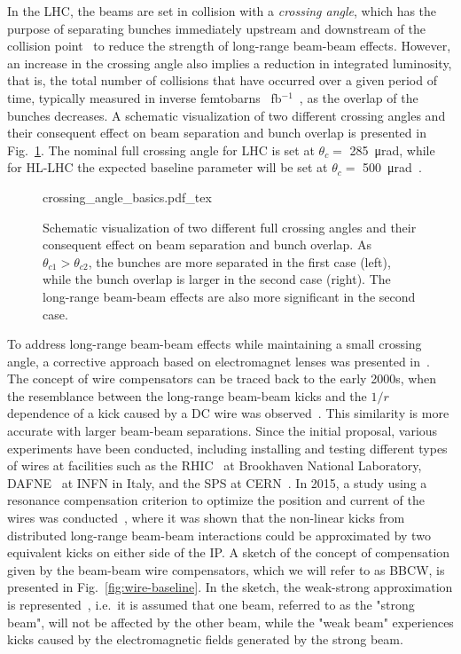 In the LHC, the beams are set in collision with a \textit{crossing angle}, which has the purpose of separating bunches immediately upstream and downstream of the collision point~\cite{Arduini_2016} to reduce the strength of long-range beam-beam effects. However, an increase in the crossing angle also implies a reduction in integrated luminosity, that is, the total number of collisions that have occurred over a given period of time, typically measured in inverse femtobarns \SI{}{fb}$^{-1}$~\cite{Herr:941318}, as the overlap of the bunches decreases. A schematic visualization of two different crossing angles and their consequent effect on beam separation and bunch overlap is presented in Fig.~\ref{fig:crossing-angles}. The nominal full crossing angle for LHC is set at $\theta_c =$ \SI{285}{\micro\radian}, while for HL-LHC the expected baseline parameter will be set at $\theta_c =$ \SI{500}{\micro\radian}~\cite{BejarAlonso:2749422}. 

\begin{figure}[hpt]
    \centering
    \def\svgwidth{1.0\textwidth}
    {crossing_angle_basics.pdf_tex}
    \caption{Schematic visualization of two different full crossing angles and their consequent effect on beam separation and bunch overlap. As $\theta_{c1} > \theta_{c2}$, the bunches are more separated in the first case (left), while the bunch overlap is larger in the second case (right). The long-range beam-beam effects are also more significant in the second case.}
    \label{fig:crossing-angles}
\end{figure}

To address long-range beam-beam effects while maintaining a small crossing angle, a corrective approach based on electromagnet lenses was presented in~\cite{Koutchouk:692058}. The concept of wire compensators can be traced back to the early 2000s, when the resemblance between the long-range beam-beam kicks and the $1/r$ dependence of a kick caused by a DC wire was observed~\cite{PhysRevSTAB.5.074001, Koutchouk:692058}. This similarity is more accurate with larger beam-beam separations. Since the initial proposal, various experiments have been conducted, including installing and testing different types of wires at facilities such as the RHIC~\cite{PhysRevSTAB.14.091001} at Brookhaven National Laboratory, DAFNE~\cite{https://doi.org/10.48550/arxiv.0803.1544} at INFN in Italy, and the SPS at CERN~\cite{Zimmermann:1955353,Koutchouk:793423}. In 2015, a study using a resonance compensation criterion to optimize the position and current of the wires was conducted~\cite{Fartoukh:2052448}, where it was shown that the non-linear kicks from distributed long-range beam-beam interactions could be approximated by two equivalent kicks on either side of the IP. A sketch of the concept of compensation given by the beam-beam wire compensators, which we will refer to as BBCW, is presented in Fig.~\ref{fig:wire-baseline}. In the sketch, the weak-strong approximation is represented~\cite{Pellegrini_2017,Banfi:1742126}, i.e.\ it is assumed that one beam, referred to as the "strong beam", will not be affected by the other beam, while the "weak beam" experiences kicks caused by the electromagnetic fields generated by the strong beam.


